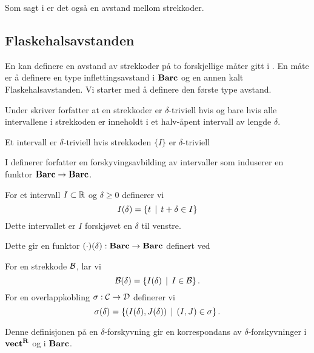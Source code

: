 Som sagt i  er det også en
avstand mellom strekkoder.

\subsection{Flaskehalsavstanden}\label{Ssek:FlaskAvstnd}
En kan definere en avstand av strekkoder på to
forskjellige måter gitt i \cite{Bauer2020}. En måte er
å definere en type inflettingsavstand i $\textnormal{\textbf{Barc}}$ og en annen
kalt Flaskehalsavstanden. Vi starter med å definere den
første type avstand.

\begin{bemerk}\label{bem:strek_triv}
  Under \citep[definisjon 1.3]{Bauer2020} skriver
  forfatter at en strekkoder er $\delta$-triviell hvis og
  bare hvis alle intervallene i strekkoden er inneholdt
  i et halv-åpent intervall av lengde $\delta$.
\end{bemerk}

\begin{bemerk}\label{bem:int_triv}
  Et intervall er $\delta$-triviell hvis strekkoden
  $\{I\}$ er $\delta$-triviell
\end{bemerk}

I \citep[seksjon 2.5]{Bauer2020} definerer forfatter en
forskyvingsavbilding av intervaller som induserer en
funktor $\textnormal{\textbf{Barc}}\to\textnormal{\textbf{Barc}}$.
\begin{definisjon}\label{def:IntSkyv}
    For et intervall $I\subset\mathbb{R}$ og $\delta\geq 0$ definerer vi
    \[I(\delta) = \left\{t\,\mid\,t+\delta\in I\right\}\]
    Dette intervallet er $I$ forskjøvet en $\delta$ til venstre.
\end{definisjon}

Dette gir en funktor $(\cdot)(\delta):\textnormal{\textbf{Barc}}\to\textnormal{\textbf{Barc}}$ definert ved

\begin{definisjon}
    For en strekkode $\mathcal{B}$, lar vi
    \[\mathcal{B}(\delta) = \left\{I(\delta)\,\mid\,I\in\mathcal{B}\right\}.\]
    For en overlappkobling $\sigma:\mathcal{C}\to\mathcal{D}$ definerer vi
    \[\sigma(\delta)
    = \left\{(I(\delta),J(\delta))\,\mid\,(I,J)\in\sigma\right\}.\]
\end{definisjon}

Denne definisjonen på en $\delta$-forskyvning gir en
korrespondans av $\delta$-forskyvninger i $\textnormal{\textbf{vect}}^{\textnormal{\textbf{{R}}}}$ og
i $\textnormal{\textbf{Barc}}$.

